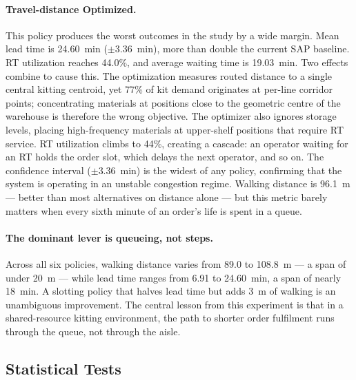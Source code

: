 \paragraph{Travel-distance Optimized.}
This policy produces the worst outcomes in the study by a wide margin.
Mean lead time is 24.60~min ($\pm 3.36$~min), more than double the
current SAP baseline.  RT utilization reaches 44.0\%, and average
waiting time is 19.03~min.  Two effects combine to cause this.  The
optimization measures routed distance to a single central kitting
centroid, yet 77\% of kit demand originates at per-line corridor
points; concentrating materials at positions close to the geometric
centre of the warehouse is therefore the wrong objective.  The
optimizer also ignores storage levels, placing high-frequency materials
at upper-shelf positions that require RT service.  RT utilization
climbs to 44\%, creating a cascade: an operator waiting for an RT
holds the order slot, which delays the next operator, and so on.  The
confidence interval ($\pm 3.36$~min) is the widest of any policy,
confirming that the system is operating in an unstable congestion
regime.  Walking distance is 96.1~m --- better than most alternatives
on distance alone --- but this metric barely matters when every sixth
minute of an order's life is spent in a queue.

\paragraph{The dominant lever is queueing, not steps.}
Across all six policies, walking distance varies from 89.0 to
108.8~m --- a span of under 20~m --- while lead time ranges from
6.91 to 24.60~min, a span of nearly 18~min.  A slotting policy that
halves lead time but adds 3~m of walking is an unambiguous improvement.
The central lesson from this experiment is that in a shared-resource
kitting environment, the path to shorter order fulfilment runs
through the queue, not through the aisle.

\subsection{Statistical Tests}\label{sec:results:stats}





